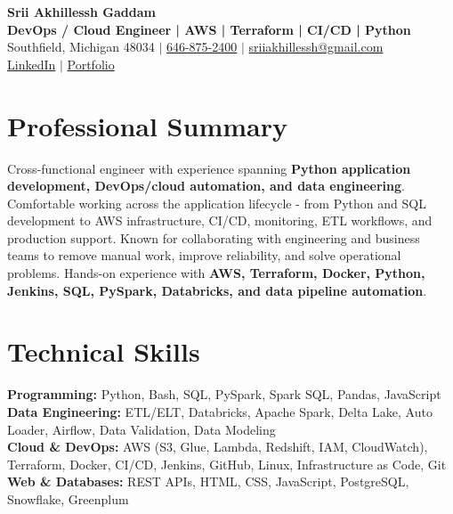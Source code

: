 \documentclass[letterpaper,10pt]{article}
\begin{document}
\fontsize{9.35pt}{10.45pt}\selectfont

\begin{center}
    {\LARGE \textbf{Srii Akhillessh Gaddam}} \\[-1pt]
    \textbf{DevOps / Cloud Engineer | AWS | Terraform | CI/CD | Python} \\[2pt]
    Southfield, Michigan 48034 $|$
    \href{tel:6468752400}{646-875-2400} $|$
    \href{mailto:sriiakhillessh@gmail.com}{sriiakhillessh@gmail.com} \\[1pt]
    \href{https://www.linkedin.com/in/srii-akhiilessh-gaddam-b48668191/}{LinkedIn} $|$
    \href{https://sriiakhillesshg.github.io/portfolio/}{Portfolio}
\end{center}
\vspace{-8pt}

\section{Professional Summary}
\small{Cross-functional engineer with experience spanning \textbf{Python application development, DevOps/cloud automation, and data engineering}. Comfortable working across the application lifecycle - from Python and SQL development to AWS infrastructure, CI/CD, monitoring, ETL workflows, and production support. Known for collaborating with engineering and business teams to remove manual work, improve reliability, and solve operational problems. Hands-on experience with \textbf{AWS, Terraform, Docker, Python, Jenkins, SQL, PySpark, Databricks, and data pipeline automation}.}

\section{Technical Skills}
\small{
\textbf{Programming:} Python, Bash, SQL, PySpark, Spark SQL, Pandas, JavaScript \\
\textbf{Data Engineering:} ETL/ELT, Databricks, Apache Spark, Delta Lake, Auto Loader, Airflow, Data Validation, Data Modeling \\
\textbf{Cloud \& DevOps:} AWS (S3, Glue, Lambda, Redshift, IAM, CloudWatch), Terraform, Docker, CI/CD, Jenkins, GitHub, Linux, Infrastructure as Code, Git \\
\textbf{Web \& Databases:} REST APIs, HTML, CSS, JavaScript, PostgreSQL, Snowflake, Greenplum
}
\end{document}
